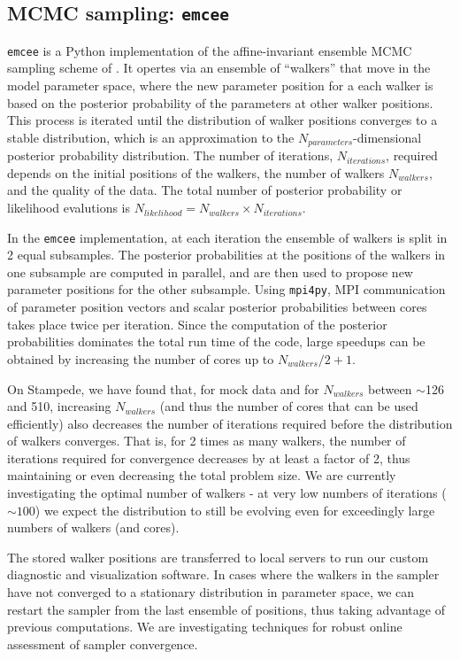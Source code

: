 \documentclass[11pt,preprint]{aastex}
\begin{document}
\subsection{MCMC sampling: \texttt{emcee}}
\label{sec:emcee}
\texttt{emcee} is a Python implementation of the affine-invariant ensemble MCMC sampling scheme of \cite{goodman_weare}.  It opertes via an ensemble of ``walkers'' that move in the model parameter space, where the new parameter position for a each walker is based on the posterior probability of the parameters at other walker positions.   This process is iterated until the distribution of walker positions converges to a stable distribution, which is an approximation to the $N_{parameters}$-dimensional posterior probability distribution. The number of iterations, $N_{iterations}$, required depends on the initial positions of the walkers, the number of walkers $N_{walkers}$, and the quality of the data.  The total number of posterior probability or likelihood evalutions is $N_{likelihood} = N_{walkers} \times N_{iterations}$.

In the \texttt{emcee} implementation, at each iteration the ensemble of walkers is split in 2 equal subsamples. The posterior probabilities at the positions of the walkers in one subsample are computed in parallel, and are then used to propose new parameter positions for the other subsample. Using \texttt{mpi4py}, MPI communication of parameter position vectors and scalar posterior probabilities between cores takes place twice per iteration. Since the computation of the posterior probabilities dominates the total run time of the code, large speedups can be obtained by increasing the number of cores up to $N_{walkers}/2 + 1$.  

On Stampede, we have found that, for mock data and for $N_{walkers}$ between $\sim$126 and 510, increasing $N_{walkers}$ (and thus the number of cores that can be used efficiently) also decreases the number of iterations required before the distribution of walkers converges.  That is, for 2 times as many walkers, the number of iterations required for convergence decreases by at least a factor of 2, thus maintaining or even decreasing the total problem size.  We are currently investigating the optimal number of walkers - at very low numbers of iterations ($\sim 100$) we expect the distribution to still be evolving even for exceedingly large numbers of walkers (and cores).

The stored walker positions are transferred to local servers to run our custom diagnostic and visualization software.  
In cases where the walkers in the sampler have not converged to a stationary distribution in parameter space, we can restart the sampler from the last ensemble of positions, thus taking advantage of previous computations.  
We are investigating techniques for robust online assessment of sampler convergence.
\end{document}
